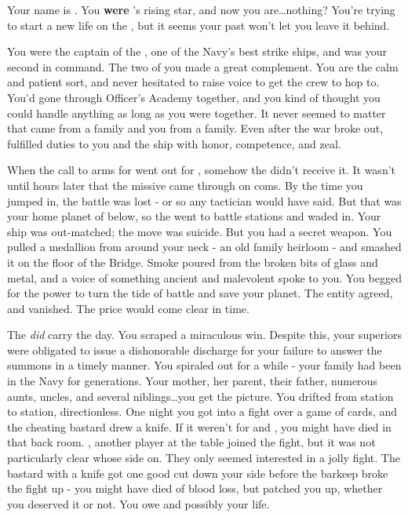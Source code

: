 \documentclass[char]{TMFHope}
\begin{document}
\name{\cCap{}}

Your name is \cCap{\full}. You {\bf were} \pTMN{}'s rising star, and now you are\ldots nothing? You're trying to start a new life on the \pNew{}, but it seems your past won't let you leave it behind. 

You were the captain of the \pOld{}, one of the Navy's best strike ships, and \cXO{\full} was your second in command. The two of you made a great complement. You are the calm and patient sort, and \cXO{} never hesitated to raise \cXO{\their} voice to get the crew to hop to. You'd gone through Officer's Academy together, and you kind of thought you could handle anything as long as you were together. It never seemed to matter that \cXO{} came from a \pEdge{} family and you from a \pPlan{} family. Even after the war broke out, \cXO{\they} fulfilled \cXO{\their} duties to you and the ship with honor, competence, and zeal. 

When the call to arms for went out for \pBattle{}, somehow the \pOld{} didn't receive it. It wasn't until hours later that the  missive came through on coms. By the time you jumped in, the battle was lost - or so any tactician would have said. But that was your home planet of \pHome{} below, so the \pOld{} went to battle stations and waded in. Your ship was out-matched; the move was suicide. But you had a secret weapon. You pulled a medallion from around your neck - an old family heirloom - and smashed it on the floor of the Bridge. Smoke poured from the broken bits of glass and metal, and a voice of something ancient and malevolent spoke to you. You begged for the power to turn the tide of battle and save your planet. The entity agreed, and vanished. The price would come clear in time.

The \pOld{} \emph{did} carry the day. You scraped a miraculous win. Despite this, your superiors were obligated to issue a dishonorable discharge for your failure to answer the summons in a timely manner. You spiraled out for a while - your family had been in the Navy for generations. Your mother, her parent, their father, numerous aunts, uncles, and several niblings\ldots you get the picture. You drifted from station to station, directionless. One night you got into a fight over a game of cards, and the cheating bastard drew a knife. If it weren't for \cSci{} and \cMed{}, you might have died in that back room. \cSci{}, another player at the table joined the fight, but it was not particularly clear whose side \cSci{\they} \cSci{\were} on. They only seemed interested in a jolly fight. The bastard with a knife got one good cut down your side before the barkeep broke the fight up - you might have died of blood loss, but \cMed{} patched you up, whether you deserved it or not. You owe \cMed{} and possibly \cSci{} your life.
\end{document}
